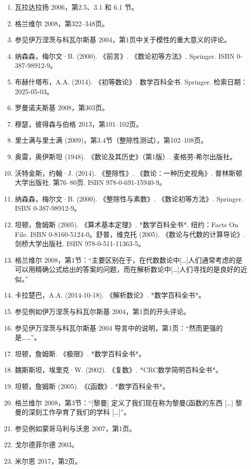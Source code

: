 \begin{enumerate}
\item 瓦拉达拉扬 2006，第2.5、3.1 和 6.1 节。
\item 格兰维尔 2008，第322–348页。
\item 参见伊万涅茨与科瓦尔斯基 2004，第1页中关于模性的重大意义的评论。
\item 纳森森，梅尔文·B. (2000). 《前言》. 《数论初等方法》. Springer. ISBN 0-387-98912-9。
\item 布赫什塔布，A.A. (2014). 《初等数论》. 数学百科全书. Springer. 检索日期：2025-05-03。
\item 罗曼诺夫斯基 2008，第303页。
\item 穆瑟，彼得森与伯格 2013，第101–102页。
\item 里士满与里士满 (2009)，第3.4节（整除性测试），第102–108页。
\item 奥雷，奥伊斯坦 (1948). 《数论及其历史》（第1版）. 麦格劳-希尔出版社。
\item 沃特金斯，约翰·J. (2014). 《整除性》. 《数论：一种历史视角》. 普林斯顿大学出版社. 第76–80页. ISBN 978-0-691-15940-9。
\item 纳森森，梅尔文·B. (2000). 《整除性与素数》. 《数论初等方法》. Springer. ISBN 0-387-98912-9。
\item 坦顿，詹姆斯 (2005). 《算术基本定理》. *数学百科全书*. 纽约：Facts On File. ISBN 0-8160-5124-0。舒普，维克托 (2005). 《数论与代数的计算导论》. 剑桥大学出版社. ISBN 978-0-511-11363-5。
\item 格兰维尔 2008，第1节：“主要区别在于，在代数数论中[…]人们通常考虑的是可以用精确公式给出的答案的问题，而在解析数论中[…]人们寻找的是良好的近似。”
\item 卡拉楚巴，A.A. (2014-10-18). 《解析数论》. *数学百科全书*。
\item 参见例如伊万涅茨与科瓦尔斯基 2004，第1页的开头评论。
\item 参见伊万涅茨与科瓦尔斯基 2004 导言中的说明，第1页：“然而更强的是……”。
\item 坦顿，詹姆斯. 《极限》. *数学百科全书*。
\item 魏斯斯坦，埃里克·W. (2002). 《复数》. *CRC数学简明百科全书*。
\item 坦顿，詹姆斯 (2005). 《ζ函数》. *数学百科全书*。
\item 格兰维尔 2008，第3节：“[黎曼] 定义了我们现在称为黎曼ζ函数的东西 […] 黎曼的深刻工作孕育了我们的学科 […]”。
\item 参见例如蒙哥马利与沃恩 2007，第1页。
\item 戈尔德菲尔德 2003。
\item 米尔恩 2017，第2页。

\end{enumerate}
